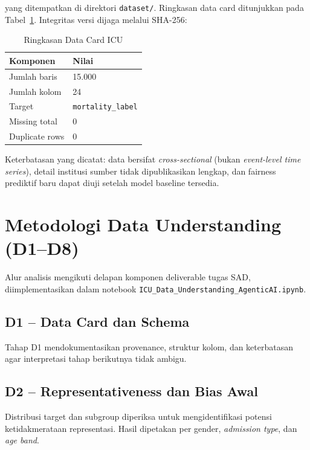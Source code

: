 \documentclass[conference]{IEEEtran}
\begin{document}
\begin{flushleft}
\small\ttfamily{}
\end{flushleft}
\noindent yang ditempatkan di direktori \texttt{dataset/}. Ringkasan data card ditunjukkan pada Tabel~\ref{tab:datacard}. Integritas versi dijaga melalui SHA-256:

\begin{center}
\small\texttt{}
\end{center}

\begin{table}[ht]
\centering
\caption{Ringkasan Data Card ICU}
\label{tab:datacard}
\begin{tabular}{ll}
\toprule
Komponen & Nilai \\
\midrule
Jumlah baris & 15.000 \\
Jumlah kolom & 24 \\
Target & \texttt{mortality\_label} \\
Missing total & 0 \\
Duplicate rows & 0 \\
\bottomrule
\end{tabular}
\end{table}

Keterbatasan yang dicatat: data bersifat \textit{cross-sectional} (bukan \textit{event-level time series}), detail institusi sumber tidak dipublikasikan lengkap, dan fairness prediktif baru dapat diuji setelah model baseline tersedia.

\section{Metodologi Data Understanding (D1--D8)}
Alur analisis mengikuti delapan komponen deliverable tugas SAD, diimplementasikan dalam notebook \texttt{ICU\_Data\_Understanding\_AgenticAI.ipynb}.

\subsection{D1 -- Data Card dan Schema}
Tahap D1 mendokumentasikan provenance, struktur kolom, dan keterbatasan agar interpretasi tahap berikutnya tidak ambigu.

\subsection{D2 -- Representativeness dan Bias Awal}
Distribusi target dan subgroup diperiksa untuk mengidentifikasi potensi ketidakmerataan representasi. Hasil dipetakan per gender, \textit{admission type}, dan \textit{age band}.
\end{document}
